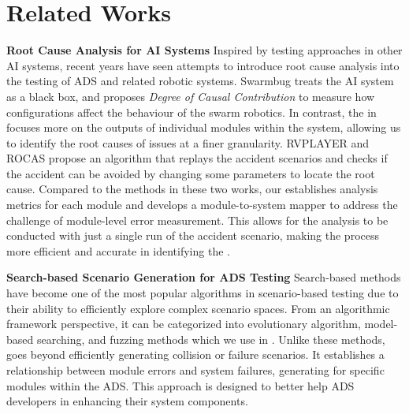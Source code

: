 \section{Related Works}\label{sec: RelatedWorks}



\noindent  \textbf{Root Cause Analysis for AI Systems}
Inspired by testing approaches in other AI systems\cite{shi2024finding, xie2023mosaic, wang2022exploratory, yu2024survey, bothe2020neuromorphic,kim2020control, hossen2023care}, recent years have seen attempts to introduce root cause analysis into the testing of ADS and related robotic systems.
Swarmbug\cite{jung2021swarmbug} treats the AI system as a black box, and proposes \textit{Degree of Causal Contribution} to measure how configurations affect the behaviour of the swarm robotics. In contrast, the \oracle in \tool focuses more on the outputs of individual modules within the system, allowing us to identify the root causes of issues at a finer granularity.
RVPLAYER\cite{choi2022rvplayer} and ROCAS\cite{feng2024rocas} propose an algorithm that replays the accident scenarios and checks if the accident can be avoided by changing some parameters to locate the root cause. %
Compared to the methods in these two works, our \oracle establishes analysis metrics for each module and develops a module-to-system mapper to address the challenge of module-level error measurement. This allows for the analysis to be conducted with just a single run of the accident scenario, making the process more efficient and accurate in identifying the \mccs.

\noindent \textbf{Search-based Scenario Generation for ADS Testing}
Search-based methods have become one of the most popular algorithms in scenario-based testing due to their ability to efficiently explore complex scenario spaces\cite{ding2023survey,zhong2021survey}. From an algorithmic framework perspective, it can be categorized into evolutionary algorithm\cite{han2021preliminary,tang2021systematic,zhou2023specification,calo2020generating,humeniuk2022search}, model-based searching\cite{haq2022efficient,haq2023many,zhong2022neural,feng2023dense,li2023generative}, and fuzzing methods\cite{pang2022mdpfuzz,cheng2023behavexplor,fu2024icsfuzz,li2020av,cheng2024evaluating,cheng2024drivetester} which we use in \tool. 
Unlike these methods, \tool goes beyond efficiently generating collision or failure scenarios. It establishes a relationship between module errors and system failures, generating \mccs for specific modules within the ADS. This approach is designed to better help ADS developers in enhancing their system components.